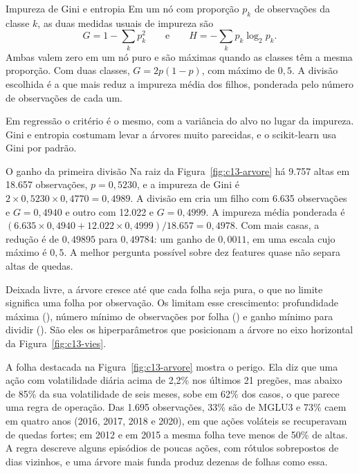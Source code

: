 \begin{definicao}{Impureza de Gini e entropia}
Em um nó com proporção $p_k$ de observações da classe $k$, as duas medidas usuais de impureza são
\begin{equation}
  G = 1 - \sum_{k} p_k^2 \qquad\text{e}\qquad H = -\sum_{k} p_k \log_2 p_k .
\end{equation}
Ambas valem zero em um nó puro e são máximas quando as classes têm a mesma proporção. Com duas classes, $G = 2p(1-p)$, com máximo de $0,5$. A divisão escolhida é a que mais reduz a impureza média dos filhos, ponderada pelo número de observações de cada um.
\end{definicao}

Em regressão o critério é o mesmo, com a variância do alvo no lugar da impureza. Gini e entropia costumam levar a árvores muito parecidas, e o scikit-learn usa Gini por padrão.

\begin{exemplo}{O ganho da primeira divisão}
Na raiz da Figura~\ref{fig:c13-arvore} há 9.757 altas em 18.657 observações, $p = 0,5230$, e a impureza de Gini é $2 \times 0,5230 \times 0,4770 = 0,4989$. A divisão em  cria um filho com 6.635 observações e $G = 0,4940$ e outro com 12.022 e $G = 0,4999$. A impureza média ponderada é $(6.635 \times 0,4940 + 12.022 \times 0,4999)/18.657 = 0,4978$. Com mais casas, a redução é de $0,49895$ para $0,49784$: um ganho de $0,0011$, em uma escala cujo máximo é $0,5$. A melhor pergunta possível sobre dez features quase não separa altas de quedas.
\end{exemplo}

Deixada livre, a árvore cresce até que cada folha seja pura, o que no limite significa uma folha por observação. Os  limitam esse crescimento: profundidade máxima (), número mínimo de observações por folha () e ganho mínimo para dividir (). São eles os hiperparâmetros que posicionam a árvore no eixo horizontal da Figura~\ref{fig:c13-vies}.

A folha destacada na Figura~\ref{fig:c13-arvore} mostra o perigo. Ela diz que uma ação com volatilidade diária acima de 2,2\% nos últimos 21 pregões, mas abaixo de 85\% da sua volatilidade de seis meses, sobe em 62\% dos casos, o que parece uma regra de operação. Das 1.695 observações, 33\% são de MGLU3 e 73\% caem em quatro anos (2016, 2017, 2018 e 2020), em que ações voláteis se recuperavam de quedas fortes; em 2012 e em 2015 a mesma folha teve menos de 50\% de altas. A regra descreve alguns episódios de poucas ações, com rótulos sobrepostos de dias vizinhos, e uma árvore mais funda produz dezenas de folhas como essa.

